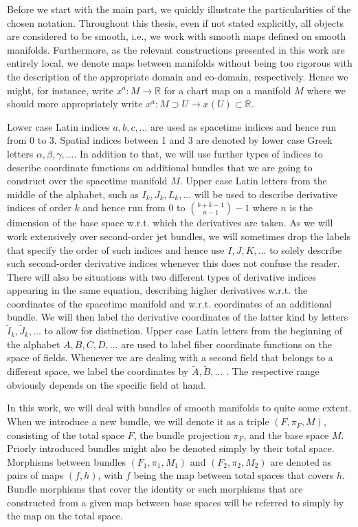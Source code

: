Before we start with the main part, we quickly illustrate the particularities of the chosen notation. Throughout this thesis, even if not stated explicitly, all objects are considered to be smooth, i.e., we work with smooth maps defined on smooth manifolds. 
Furthermore, as the relevant constructions presented in this work are entirely local, we denote maps between manifolds without being too rigorous with the description of the appropriate domain and co-domain, respectively. Hence we might, for instance, write $x^a : M
\rightarrow \mathbb{R}$ for a chart map on a manifold $M$ where we should more appropriately write $x^a : M \supset U  \rightarrow x(U) \subset \mathbb{R} $. 

Lower case Latin indices $a,b,c,...$ are used as spacetime indices and hence run from 0 to 3. Spatial indices between 1 and 3 are denoted by lower case Greek letters $\alpha,\beta,\gamma,...$. In addition to that, we will use further types of indices to describe coordinate functions on additional bundles that we are going to construct over the spacetime manifold $M$. Upper case Latin letters from the middle of the alphabet, such as $I_k,J_k,L_k,...$ will be used to describe derivative indices of order $k$ and hence run from $0$ to $\binom{b+k-1}{n-1}-1$ where $n$ is the dimension of the base space w.r.t. which the derivatives are taken. As we will work extensively over second-order jet bundles, we will sometimes drop the labels that specify the order of such indices and hence use $I,J,K,...$ to solely describe such second-order derivative indices whenever this does not confuse the reader.
There will also be situations with two different types of derivative indices appearing in the same equation, describing higher derivatives w.r.t. the coordinates of the spacetime manifold and w.r.t. coordinates of an additional bundle. We will then label the derivative coordinates of the latter kind by letters $\tilde{I}_k, \tilde{J}_k,...$ to allow for distinction.
Upper case Latin letters from the beginning of the alphabet $A,B,C,D,...$ are used to label fiber coordinate functions on the space of fields. Whenever we are dealing with a second field that belongs to a different space, we label the coordinates by $\tilde{A}, \tilde{B},...$ . The respective range obviously depends on the specific field at hand.

In this work, we will deal with bundles of smooth manifolds to quite some extent. When we introduce a new bundle, we will denote it as a triple $(F,\pi_F,M)$, consisting of the total space $F$, the bundle projection $\pi_F$, and the base space $M$. Priorly introduced bundles might also be denoted simply by their total space. Morphisms between bundles $(F_1,\pi_1,M_1)$ and $(F_2,\pi_2,M_2)$ are denoted as pairs of maps $(f,h)$, with $f$ being the map between total spaces that covers $h$. Bundle morphisms that cover the identity or such morphisms that are constructed from a given map between base spaces will be referred to simply by the map on the total space.

